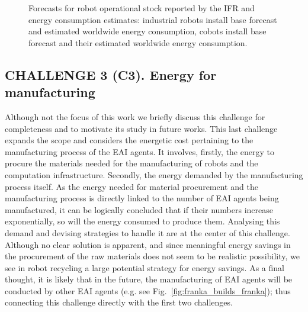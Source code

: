 \begin{figure}[!t]
	\hfill    
	\hspace*{\fill}    
	\caption[] {\label{fig:robot_forecasts} Forecasts for robot operational stock reported by the IFR and energy consumption estimates:  industrial robots install base forecast and  estimated worldwide energy consumption,   cobots install base forecast and their  estimated worldwide energy consumption.}
\end{figure}
\subsection{\textbf{CHALLENGE 3} (C3). Energy for manufacturing}
Although not the focus of this work we briefly discuss this challenge for completeness and to motivate its study in future works. This last challenge expands the scope and considers the energetic cost pertaining to the manufacturing process of the EAI agents. It involves, firstly, the energy to procure the materials needed for the manufacturing of robots and the computation infrastructure. Secondly, the energy demanded by the manufacturing process itself. As the energy needed for material procurement and the manufacturing process is directly linked to the number of EAI agents being manufactured, it can be logically concluded that if their numbers increase exponentially, so will the energy consumed to produce them. Analysing this demand and devising strategies to handle it are at the center of this challenge. Although no clear solution is apparent, and since  meaningful energy savings in the procurement of the raw materials does not seem to be realistic possibility, we see in robot recycling a large potential strategy for energy savings. As a final thought, it is likely that in the future, the manufacturing of EAI agents will be conducted by other EAI agents (e.g. see Fig.~\ref{fig:franka_builds_franka}); thus connecting this challenge directly with the first two challenges.


